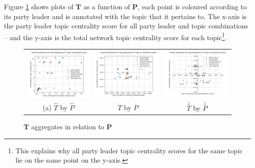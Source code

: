 Figure \ref{fig:topic_centrality} shows plots of $\textbf{T}$ as a function of
$\textbf{P}$, each point is coloured according to its party leader and is
annotated with the topic that it pertains to. The x-axis is the party leader
topic centrality score for all party leader and topic combinations -- and the y-axis
is the total network topic centrality score for each topic\footnote{This
explains why all party leader topic centrality scores for the same topic lie on
the same point on the y-axis.}.

\begin{singlespacing}
    \begin{figure}
        \centering
        \begin{tabular}{ccc}
        \includegraphics[width=50mm]{Figures/sum_opposing_centrality_chart_(expanded)} &
        \includegraphics[width=50mm]{Figures/mean_opposing_centrality_chart_(expanded)} &
        \includegraphics[width=50mm]{Figures/zscore_opposing_centrality_chart_(expanded)} \\
        (a)  \textbf{$\hat{T}$} by \textbf{$\hat{P}$} & \textbf{$\overline{T}$} by \textbf{$\overline{P}$} &  \textbf{$\stackrel{z}{T}$} by \textbf{$\stackrel{z}{P}$} \\[6pt]
        \end{tabular}
        \caption[$\textbf{T}$ aggregates in relation to $\textbf{P}$]{$\textbf{T}$ aggregates in relation to $\textbf{P}$}
        \label{fig:topic_centrality}
    \end{figure}
\end{singlespacing}

